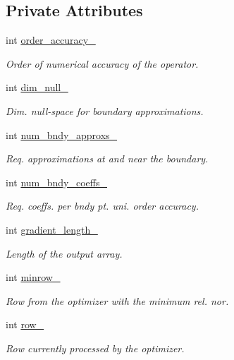 \subsection*{Private Attributes}
\begin{DoxyCompactItemize}
\item 
int \hyperlink{classmtk_1_1Grad1D_a545e9c865e5d4716f2684a64f744c78c}{order\-\_\-accuracy\-\_\-}
\begin{DoxyCompactList}\small\item\em Order of numerical accuracy of the operator. \end{DoxyCompactList}\item 
int \hyperlink{classmtk_1_1Grad1D_abe8eaf4f5c451f82c062daaef31e9e6a}{dim\-\_\-null\-\_\-}
\begin{DoxyCompactList}\small\item\em Dim. null-\/space for boundary approximations. \end{DoxyCompactList}\item 
int \hyperlink{classmtk_1_1Grad1D_abe15c1ffd9dfaba1a65f4f0e096287ce}{num\-\_\-bndy\-\_\-approxs\-\_\-}
\begin{DoxyCompactList}\small\item\em Req. approximations at and near the boundary. \end{DoxyCompactList}\item 
int \hyperlink{classmtk_1_1Grad1D_a60c560882bc601f9ab1d4cd5331e55ef}{num\-\_\-bndy\-\_\-coeffs\-\_\-}
\begin{DoxyCompactList}\small\item\em Req. coeffs. per bndy pt. uni. order accuracy. \end{DoxyCompactList}\item 
int \hyperlink{classmtk_1_1Grad1D_a98a444d0833fec92fb9908e3ea71a511}{gradient\-\_\-length\-\_\-}
\begin{DoxyCompactList}\small\item\em Length of the output array. \end{DoxyCompactList}\item 
int \hyperlink{classmtk_1_1Grad1D_a27b8a20e163ad803546592cc3736c12a}{minrow\-\_\-}
\begin{DoxyCompactList}\small\item\em Row from the optimizer with the minimum rel. nor. \end{DoxyCompactList}\item 
int \hyperlink{classmtk_1_1Grad1D_a7947235d61d0dd27c5b81a81ca78d9a8}{row\-\_\-}
\begin{DoxyCompactList}\small\item\em Row currently processed by the optimizer. \end{DoxyCompactList}\item 

\end{DoxyCompactItemize}
